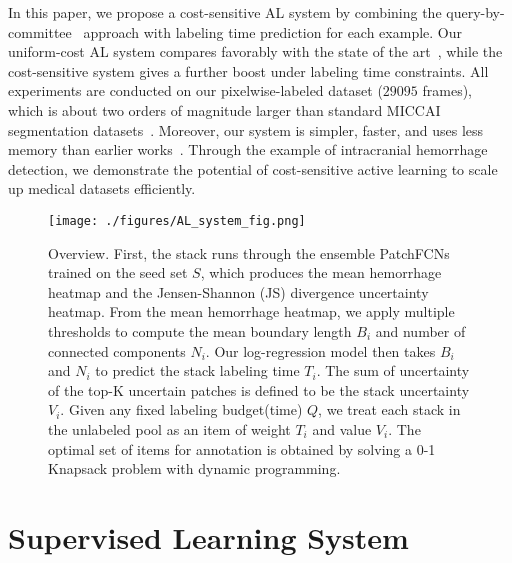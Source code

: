 \documentclass{llncs}
\begin{document}
In this paper, we propose a cost-sensitive AL system by combining the query-by-committee~\cite{seung1992query} approach with labeling time prediction for each example. Our uniform-cost AL system compares favorably with the state of the art~\cite{yang2017suggestive}, while the cost-sensitive system gives a further boost under labeling time constraints. All experiments are conducted on our pixelwise-labeled dataset ($29095$ frames), which is about two orders of magnitude larger than standard MICCAI segmentation datasets~\cite{sirinukunwattana2017gland,zhang2016coarse}.
Moreover, our system is simpler, faster, and uses less memory than earlier works~\cite{yang2017suggestive,sener2018active}. Through the example of intracranial hemorrhage detection, we demonstrate the potential of cost-sensitive active learning to scale up medical datasets efficiently.  

\begin{figure}[t]
    \centering
    \texttt{[image: ./figures/AL\_system\_fig.png]}
    \vspace*{-0.3cm}
    \caption{Overview. %
    First, the stack runs through the ensemble PatchFCNs trained on the seed set $S$, which produces the mean hemorrhage heatmap and the Jensen-Shannon (JS) divergence uncertainty heatmap. From the mean hemorrhage heatmap, we apply multiple thresholds to compute the mean boundary length $B_i$ and number of connected components $N_i$. Our log-regression model then takes $B_i$ and $N_i$ to predict the stack labeling time $T_i$. The sum of uncertainty of the top-K uncertain patches is defined to be the stack uncertainty $V_i$. Given any fixed labeling budget(time) $Q$, we treat each stack in the unlabeled pool as an item of weight $T_i$ and value $V_i$. The optimal set of items for annotation is obtained by solving a 0-1 Knapsack problem with dynamic programming.
    }
    \vspace*{-0.3cm}
    \label{fig:system}
\end{figure}

\vspace*{-0.2cm}
\section{Supervised Learning System}
\vspace*{-0.2cm}
\end{document}
